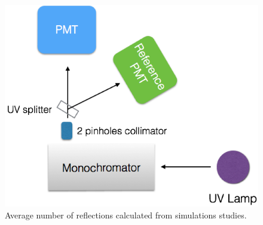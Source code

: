 \begin{figure}
	\centering
	\includegraphics[width=1.0\columnwidth,keepaspectratio]{img/pmtTestingSetup.png}
	\caption{Average number of reflections calculated from simulations studies.}
	\label{fig:pmtTestingSetup}
\end{figure}



